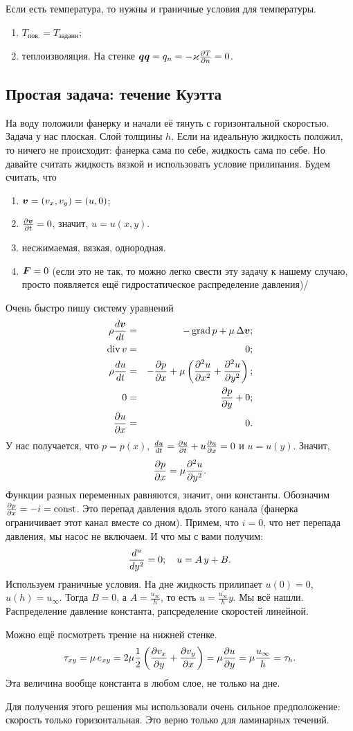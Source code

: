 Если есть температура, то нужны и граничные условия для температуры. 
\begin{enumerate}
\item $T_{\text{пов.}} = T_{\text{заданн}}$;
\item теплоизволяция. На стенке $\boldsymbol{q}\boldsymbol{q} = q_n = -\varkappa\frac{\partial T}{\partial n}=0$.
\end{enumerate}
\subsection{Простая задача: течение Куэтта}
На воду положили фанерку и начали её тянуть с горизонтальной скоростью. Задача у нас плоская. Слой толщины $h$. Если на идеальную жидкость положил, то ничего не происходит: фанерка сама по себе, жидкость сама по себе. Но давайте считать жидкость вязкой и использовать условие прилипания. Будем считать, что 
\begin{enumerate}
\item $\boldsymbol{v}=(v_x,v_y)=( u,0)$;
\item $\frac{\partial \boldsymbol{v}}{\partial t} = 0$, значит, $ u =u(x,y)$.
\item несжимаемая, вязкая, однородная.
\item $\boldsymbol{F}=0$ (если это не так, то можно легко свести эту задачу к нашему случаю, просто появляется ещё гидростатическое распределение давления)/
\end{enumerate}
Очень быстро пишу систему уравнений
\begin{eqnarray*}
  \rho \frac{d\boldsymbol{v}}{dt} &=& -\operatorname{grad} p + \mu\,\Delta\boldsymbol{v};\\
  \operatorname{div} v &=&0;\\
  \rho\frac{du}{dt} &=& -\frac{\partial p}{\partial x} + \mu\left(\frac{\partial ^2u}{\partial x^2} + \frac{\partial ^2u}{\partial y^2}\right);\\
  0&=&\frac{\partial p}{\partial y} + 0;\\
  \frac{\partial u}{\partial x} &=& 0.
\end{eqnarray*}
У нас получается, что $p=p(x)$, $\frac{du}{dt} = \frac{\partial u}{\partial t} + u\frac{\partial u}{\partial x} = 0$ и $u=u(y)$. Значит,
\[
  \frac{\partial p}{\partial x} = \mu\frac{\partial ^2u}{\partial y^2}.
\]
Функции разных переменных равняются, значит, они константы. Обозначим $\frac{\partial p}{\partial x} = -i=\operatorname{const}$. Это перепад давления вдоль этого канала (фанерка ограничивает этот канал вместе со дном). Примем, что $i=0$, что нет перепада давления, мы насос не включаем. И что мы с вами получим:
\[
  \frac{d^u}{dy^2} = 0;\quad u = A\,y+ B.
\]
Используем граничные условия. На дне жидкость прилипает $u(0)=0$, $u(h) = u_{\infty}$. Тогда $B=0$, а $A = \frac{u_\infty}h$, то есть $u = \frac{u_\infty}hy$. Мы всё нашли. Распределение давление константа, рапсределение скоростей линейной.

Можно ещё посмотреть трение на нижней стенке.
\[
  \tau_{xy} = \mu\,e_{xy} = 2\mu\frac12\left(\frac{\partial v_x}{\partial y} + \frac{\partial v_y}{\partial x}\right) = \mu\frac{\partial u}{\partial y}  = \mu\frac{u_\infty}h =\tau_h.
\]
Эта величина вообще константа в любом слое, не только на дне.

Для получения этого решения мы использовали очень сильное предположение: скорость только горизонтальная. Это верно только для ламинарных течений.
